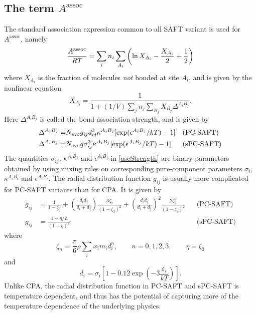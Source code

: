 \documentclass[english]{../thermomemo/thermomemo}
\newcommand{\z}{\zeta}
\newcommand{\lp}{\left(}
\newcommand{\rp}{\right)}
\begin{document}
\subsection{The term $A^{\text{assoc}}$}
The standard association expression common to all SAFT variant is used for
$A^{\text{assoc}}$, namely
\begin{equation}
  \frac{A^{\rm assoc}}{RT} = \sum_{i} n_i \sum_{A_i} \lp \ln X_{A_i} - \frac{X_{A_i}}{2} + \frac{1}{2} \rp
\end{equation}
where $X_{A_i}$ is the fraction of molecules \textit{not} bonded at site $A_i$,
and is given by the nonlinear equation
\begin{equation}
  X_{A_i} = \frac{1}{1+(1/V) \sum_j n_j \sum_{B_j} X_{B_j} \Delta^{A_i B_j}}.
\end{equation}
Here $\Delta^{A_i B_j}$ is called the bond association strength, and is given by
\begin{align}
    \Delta^{A_i B_j} =& N_{\rm avo} g_{ij} d_{ij}^3 \kappa^{A_i B_j} [\exp(\epsilon^{A_i B_j}/kT) - 1] &&\text{(PC-SAFT)}\\ \label{ascStrength}
    \Delta^{A_i B_j} =& N_{\rm avo} g \sigma_{ij}^3 \kappa^{A_i B_j} [\exp(\epsilon^{A_i B_j}/kT) - 1] &&\text{(sPC-SAFT)}
\end{align}
The quantities $\sigma_{ij}$, $\kappa^{A_i B_j}$ and $\epsilon^{A_i B_j}$ in
\eqref{ascStrength} are binary parameters obtained by using mixing rules on
corresponding pure-component parameters $\sigma_{i}$, $\kappa^{A_i B_i}$ and
$\epsilon^{A_i B_i}$. The radial distribution function $g_{ij}$ is usually more
complicated for PC-SAFT variants than for CPA. It is given by
\begin{align}
  g_{ij} &= \frac{1}{1-\z_3} + \lp \frac{d_id_j}{d_i+d_j} \rp \frac{3\z_2}{(1-\z_3)^2} + \lp \frac{d_i d_j}{d_i+d_j} \rp^2 \frac{2\z_2^2}{(1-\z_3)^2} && \text{(PC-SAFT)} \\ \label{gij}
  g_{ij} &= \frac{1-\eta/2}{(1-\eta)^3} && \text{(sPC-SAFT)}
\end{align}
where
\begin{equation}
  \label{eq:z_n}
  \z_n = \frac{\pi}{6} \rho \sum_i x_i m_i d_i^n, \qquad n = 0,1,2,3, \qquad \eta = \zeta_3
\end{equation}
and
\begin{equation}
  \label{eq:di}
  d_i = \sigma_i \left[1 - 0.12\exp \lp -3\frac{\varepsilon_i}{kT} \rp \right].
\end{equation}
Unlike CPA, the radial distribution function in PC-SAFT and sPC-SAFT is
temperature dependent, and thus has the potential of capturing more of the
temperature dependence of the underlying physics.
\end{document}
